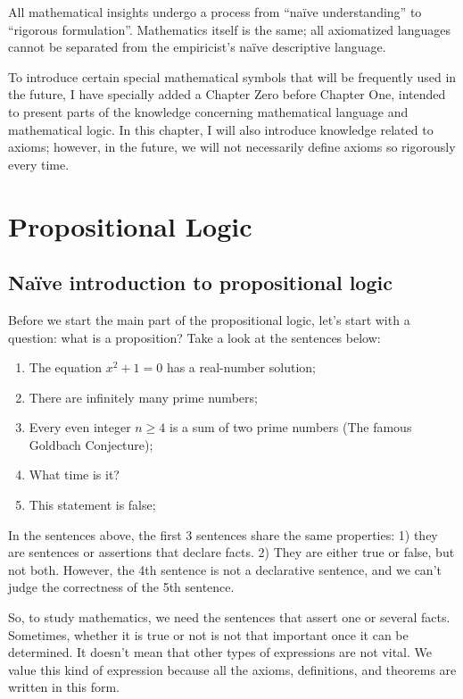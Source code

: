 \chapterzero

All mathematical insights undergo a process from “naïve understanding” to “rigorous formulation”. Mathematics itself is the same; all axiomatized languages cannot be separated from the empiricist’s naïve descriptive language.

To introduce certain special mathematical symbols that will be frequently used in the future, I have specially added a Chapter Zero before Chapter One, intended to present parts of the knowledge concerning mathematical language and mathematical logic. In this chapter, I will also introduce knowledge related to axioms; however, in the future, we will not necessarily define axioms so rigorously every time.

\section{Propositional Logic}

\subsection{Naïve introduction to propositional logic}
Before we start the main part of the propositional logic, let’s start with a question: what is a proposition? Take a look at the sentences below:
\begin{enumerate}
    \item The equation $x^2+1=0$ has a real-number solution;
    \item There are infinitely many prime numbers;
    \item Every even integer $n \ge 4$ is a sum of two prime numbers (The famous Goldbach Conjecture);
    \item What time is it?
    \item This statement is false;
\end{enumerate}
In the sentences above, the first 3 sentences share the same properties: 1) they are sentences or assertions that declare facts. 2) They are either true or false, but not both. However, the 4th sentence is not a declarative sentence, and we can’t judge the correctness of the 5th sentence.

So, to study mathematics, we need the sentences that assert one or several facts. Sometimes, whether it is true or not is not that important once it can be determined. It doesn’t mean that other types of expressions are not vital. We value this kind of expression because all the axioms, definitions, and theorems are written in this form.

